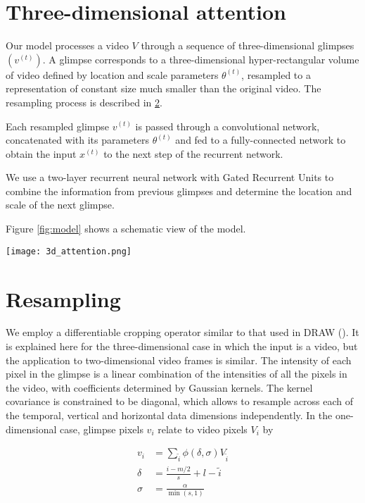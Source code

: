 \documentclass{article} %
\begin{document}
\section{Three-dimensional attention}

Our model processes a video $V$ through a sequence of three-dimensional glimpses $\left(v^{(t)}\right)$.
A glimpse corresponds to a three-dimensional hyper-rectangular volume of video defined by location and scale parameters $\theta^{(t)}$, resampled to a representation of constant size much smaller than the original video.
The resampling process is described in \ref{sec:resampling}.

Each resampled glimpse $v^{(t)}$ is passed through a convolutional network, concatenated with its parameters $\theta^{(t)}$ and fed to a fully-connected network to obtain the input $x^{(t)}$ to the next step of the recurrent network.

We use a two-layer recurrent neural network with Gated Recurrent Units\cite{Cho2014} to combine the information from previous glimpses and determine the location and scale of the next glimpse.

Figure \ref{fig:model} shows a schematic view of the model.

\texttt{[image: 3d\_attention.png]}




\section{Resampling}
\label{sec:resampling}
We employ a differentiable cropping operator similar to that used in DRAW (\cite{gregor2015draw}).
It is explained here for the three-dimensional case in which the input is
a video, but the application to two-dimensional video frames is similar.
The intensity of each pixel in the glimpse is a linear combination of the intensities of all the pixels in the video, with coefficients determined by Gaussian kernels.
The kernel covariance is constrained to be diagonal, which allows to resample across each of the temporal, vertical and horizontal data dimensions independently.
In the one-dimensional case, glimpse pixels $v_i$ relate to video pixels $V_i$ by

\begin{equation}
\begin{split}
v_i &= \sum_{\tilde{i}} \phi(\delta,\sigma) V_{\tilde{i}} \\
\delta & =  \frac{i - m/2}{s} + l - \tilde{i} \\
\sigma & =  \frac{\alpha}{\min(s, 1)}
\end{split}
\end{equation}
\end{document}
